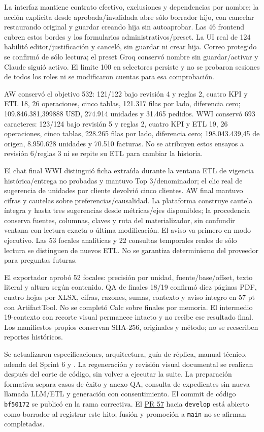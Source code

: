 \documentclass[11pt,letterpaper]{article}
\newcommand{\file}[1]{\texttt{#1}}
\begin{document}
La interfaz mantiene contrato efectivo, exclusiones y dependencias por nombre;
la acción explícita desde aprobada/invalidada abre sólo borrador hijo, con cancelar
restaurando original y guardar creando hija sin autoaprobar. Las 46 frontend
cubren estos bordes y los formularios administrativos/preset. La UI real de 124
habilitó editor/justificación y canceló, sin guardar ni crear hija. Correo protegido
se confirmó de sólo lectura; el preset Groq conservó nombre sin guardar/activar y
Claude siguió activo. El límite 100 en selectores persiste y no se probaron sesiones
de todos los roles ni se modificaron cuentas para esa comprobación.

AW conservó el objetivo 532: 121/122 bajo revisión 4 y reglas 2, cuatro KPI y ETL 18,
26 operaciones, cinco tablas, 121.317 filas por lado, diferencia cero;
109.846.381,399888 USD, 274.914 unidades y 31.465 pedidos. WWI conservó 693 caracteres:
123/124 bajo revisión 5 y reglas 2, cuatro KPI y ETL 19, 26 operaciones, cinco tablas,
228.265 filas por lado, diferencia cero; 198.043.439,45 de origen, 8.950.628 unidades
y 70.510 facturas. No se atribuyen estos ensayos a revisión 6/reglas 3 ni se repite
su ETL para cambiar la historia.

El chat final WWI distinguió ficha extraída durante la ventana ETL de vigencia
histórica/entrega no probadas y mantuvo Top 3/denominador; el clic real de sugerencia
de unidades por cliente devolvió cinco clientes. AW final mantuvo cifras y cautelas
sobre preferencias/causalidad. La plataforma construye cautela íntegra y hasta tres
sugerencias desde métricas/ejes disponibles; la procedencia conserva fuentes,
columnas, claves y ruta del materializador, sin confundir ventana con lectura exacta
o última modificación. El aviso va primero en modo ejecutivo. Las 53 focales
analíticas y 22 consultas temporales reales de sólo lectura se distinguen de nuevos
ETL. No se garantiza determinismo del proveedor para preguntas futuras.

El exportador aprobó 52 focales: precisión por unidad, fuente/base/offset, texto
literal y altura según contenido. QA de finales 18/19 confirmó diez páginas PDF,
cuatro hojas por XLSX, cifras, razones, sumas, contexto y aviso íntegro en 57 pt con
ArtifactTool. No se completó Calc sobre finales por memoria. El intermedio
19-contexto con recorte visual permanece intacto y no recibe ese resultado final.
Los manifiestos propios conservan SHA-256, originales y método; no se reescriben
reportes históricos.

Se actualizaron especificaciones, arquitectura, guía de réplica, manual técnico,
adenda del Sprint 6 y . La regeneración
y revisión visual documental se realizan después del corte de código, sin volver
a ejecutar la suite. La preparación formativa separa casos de éxito y anexo QA,
consulta de expedientes sin nueva llamada LLM/ETL y generación con consentimiento.
El commit de código \file{bf50172} se publicó en la rama correctiva. El
\href{https://github.com/LFXAS/prototipo-bi-ia/pull/57}{PR 57} hacia \file{develop}
está abierto como borrador al registrar este hito; fusión y promoción a \file{main}
no se afirman completadas.
\end{document}
